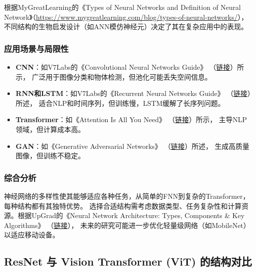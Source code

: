 \documentclass[UTF8]{report}
\theoremstyle{MyLineTheoremStyle} %
\theoremstyle{MyBlockTheoremStyle} %
\theoremstyle{MySubsubsectionStyle} %
\begin{document}
根据MyGreatLearning的《Types of Neural Networks and Definition of Neural Network》（\url{https://www.mygreatlearning.com/blog/types-of-neural-networks/}），不同结构的生物启发设计（如ANN模仿神经元）决定了其在复杂应用中的表现。

\subsubsection{应用场景与局限性}
\begin{itemize}
    \item \textbf{CNN}：如V7Labs的《Convolutional Neural Networks Guide》
          （\href{https://www.v7labs.com/blog/convolutional-neural-networks-guide/}{链接}）所示，
          广泛用于图像分类和物体检测，但池化可能丢失空间信息。
    \item \textbf{RNN和LSTM}：如V7Labs的《Recurrent Neural Networks Guide》
          （\href{https://www.v7labs.com/blog/recurrent-neural-networks-guide/}{链接}）所述，
          适合NLP和时间序列，但训练慢，LSTM缓解了长序列问题。
    \item \textbf{Transformer}：如《Attention Is All You Need》
          （\href{https://arxiv.org/abs/1706.03762}{链接}）所示，
          主导NLP领域，但计算成本高。
    \item \textbf{GAN}：如《Generative Adversarial Networks》
          （\href{https://papers.nips.cc/paper/5423-generative-adversarial-nets.pdf}{链接}）所述，
          生成高质量图像，但训练不稳定。
\end{itemize}

\subsubsection{综合分析}
神经网络的多样性使其能够适应各种任务，从简单的FNN到复杂的Transformer，每种结构都有其独特优势。
选择合适结构需考虑数据类型、任务复杂性和计算资源。根据UpGrad的《Neural Network Architecture: 
Types, Components \& Key Algorithms》
（\href{https://www.upgrad.com/blog/neural-network-architecture-components-algorithms/}{链接}），
未来的研究可能进一步优化轻量级网络（如MobileNet）以适应移动设备。



\cleardoublepage

\subsection{ResNet 与 Vision Transformer (ViT) 的结构对比}
\end{document}
